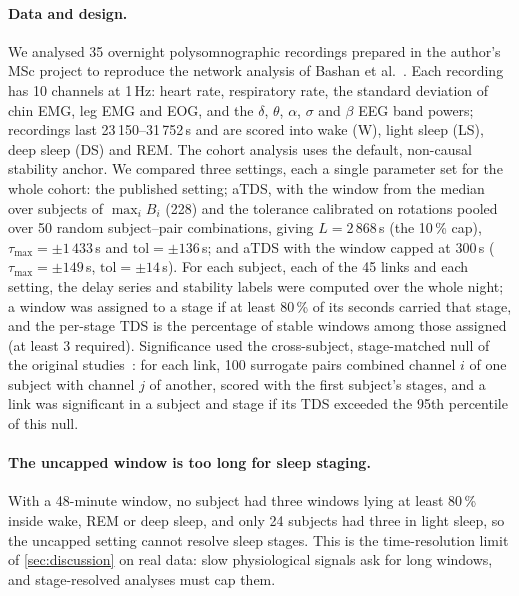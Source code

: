 \documentclass[11pt,a4paper]{article}
\begin{document}
\paragraph{Data and design.} We analysed 35 overnight polysomnographic recordings prepared in the author's MSc project to reproduce the network analysis of Bashan et al.~\cite{Bashan2012NetworkPhysiology}. Each recording has 10 channels at 1\,Hz: heart rate, respiratory rate, the standard deviation of chin EMG, leg EMG and EOG, and the $\delta$, $\theta$, $\alpha$, $\sigma$ and $\beta$ EEG band powers; recordings last 23\,150--31\,752\,s and are scored into wake (W), light sleep (LS), deep sleep (DS) and REM. The cohort analysis uses the default, non-causal stability anchor. We compared three settings, each a single parameter set for the whole cohort: the published setting; aTDS, with the window from the median over subjects of $\max_i B_i$ (228) and the tolerance calibrated on rotations pooled over 50 random subject--pair combinations, giving $L = 2\,868$\,s (the 10\,\% cap), $\tau_{\max} = \pm1\,433$\,s and $\mathrm{tol} = \pm136$\,s; and aTDS with the window capped at 300\,s ($\tau_{\max} = \pm149$\,s, $\mathrm{tol} = \pm14$\,s). For each subject, each of the 45 links and each setting, the delay series and stability labels were computed over the whole night; a window was assigned to a stage if at least 80\,\% of its seconds carried that stage, and the per-stage TDS is the percentage of stable windows among those assigned (at least 3 required). Significance used the cross-subject, stage-matched null of the original studies~\cite{Bashan2012NetworkPhysiology}: for each link, 100 surrogate pairs combined channel $i$ of one subject with channel $j$ of another, scored with the first subject's stages, and a link was significant in a subject and stage if its TDS exceeded the 95th percentile of this null.

\paragraph{The uncapped window is too long for sleep staging.} With a 48-minute window, no subject had three windows lying at least 80\,\% inside wake, REM or deep sleep, and only 24 subjects had three in light sleep, so the uncapped setting cannot resolve sleep stages. This is the time-resolution limit of \cref{sec:discussion} on real data: slow physiological signals ask for long windows, and stage-resolved analyses must cap them.
\end{document}
